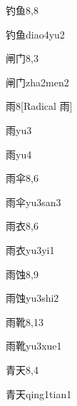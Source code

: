\begin{entry}{钓鱼}{8,8}
  \begin{phonetics}{钓鱼}{diao4yu2}
  \end{phonetics}
\end{entry}

\begin{entry}{闸门}{8,3}
  \begin{phonetics}{闸门}{zha2men2}
  \end{phonetics}
\end{entry}

\begin{entry}{雨}{8}[Radical 雨]
  \begin{phonetics}{雨}{yu3}
  \end{phonetics}
  \begin{phonetics}{雨}{yu4}
  \end{phonetics}
\end{entry}

\begin{entry}{雨伞}{8,6}
  \begin{phonetics}{雨伞}{yu3san3}
  \end{phonetics}
\end{entry}

\begin{entry}{雨衣}{8,6}
  \begin{phonetics}{雨衣}{yu3yi1}
  \end{phonetics}
\end{entry}

\begin{entry}{雨蚀}{8,9}
  \begin{phonetics}{雨蚀}{yu3shi2}
  \end{phonetics}
\end{entry}

\begin{entry}{雨靴}{8,13}
  \begin{phonetics}{雨靴}{yu3xue1}
  \end{phonetics}
\end{entry}

\begin{entry}{青天}{8,4}
  \begin{phonetics}{青天}{qing1tian1}
  \end{phonetics}
\end{entry}


